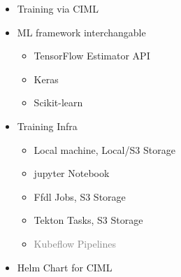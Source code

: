 \documentclass[aspectratio=169,11pt,hyperref={colorlinks=true}]{beamer}
\newcommand{\light}[1]{\textcolor{gray}{#1}}
\begin{document}
\begin{frame}
\begin{columns}
\begin{centering}
        \end{centering}
        \begin{itemize}
          \item{Training via CIML}
          \item{ML framework interchangable}
          \begin{itemize}
            \item{TensorFlow Estimator API}
            \item{Keras}
            \item{Scikit-learn}
          \end{itemize}
          \item{Training Infra}
          \begin{itemize}
            \item{Local machine, Local/S3 Storage}
            \item{jupyter Notebook}
            \item{Ffdl Jobs, S3 Storage}
            \item{Tekton Tasks, S3 Storage}
            \item{\light{Kubeflow Pipelines}}
          \end{itemize}
          \item{Helm Chart for CIML}
        \end{itemize}
    \end{columns}
\end{frame}
\end{document}
